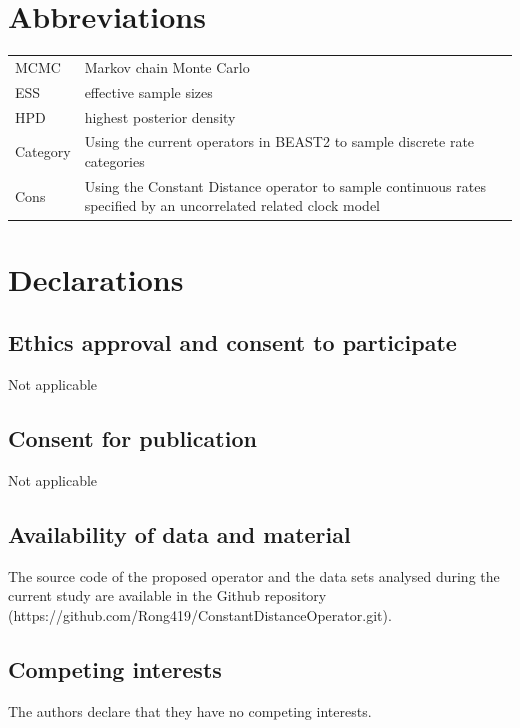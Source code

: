 \documentclass{bmcart}
\begin{document}
\begin{backmatter}
\section*{Abbreviations}
\begin{table}[h!]
\raggedright
\begin{tabular}{ll}
MCMC&Markov chain Monte Carlo\\
ESS&effective sample sizes\\ 
HPD&highest posterior density\\
Category & Using the current operators in BEAST2 to sample discrete rate categories\\
Cons & Using the Constant Distance operator to sample continuous rates specified by an uncorrelated related clock model\\
\end{tabular}
\end{table}

\section*{Declarations}
\subsection*{Ethics approval and consent to participate}
Not applicable

\subsection*{Consent for publication}
Not applicable

\subsection*{Availability of data and material}
The source code of the proposed operator and the data sets analysed during the current study are available in the Github repository (https://github.com/Rong419/ConstantDistanceOperator.git).  

\subsection*{Competing interests}
The authors declare that they have no competing interests.


\end{backmatter}
\end{document}
